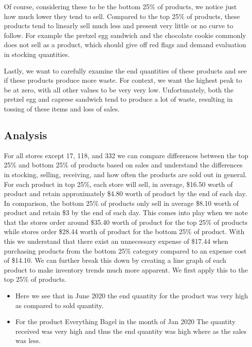 Of course, considering these to be the bottom 25\% of products, we notice just how much lower they tend to sell. Compared to the top 25\% of products, these products tend to linearly sell much less and present very little or no curve to follow. For example the pretzel egg sandwich and the chocolate cookie commonly does not sell as a product, which should give off red flags and demand evaluation in stocking quantities. 

Lastly, we want to carefully examine the end quantities of these products and see if these products produce more waste. For context, we want the highest peak to be at zero, with all other values to be very very low. Unfortunately, both the pretzel egg and caprese sandwich tend to produce a lot of waste, resulting in tossing of these items and loss of sales.

\subsection{Analysis}

For all stores except 17, 118, and 332 we can compare differences between the top 25\% and bottom 25\% of products based on sales and  understand the differences in stocking, selling, receiving, and how often the products are sold out in general. For each product in top 25\%, each  store will sell, in average, \$16.50 worth of product and retain approximately \$4.80 worth of product by the end of each day. In comparison, the  bottom 25\% of products only sell in average \$8.10 worth of product and retain \$3 by the end of each day. This comes into play when we note that  the stores order around \$35.40 worth of product for the top 25\% of products while stores order \$28.44 worth of product for the bottom 25\% of  product. With this we understand that there exist an unnecessary expense of \$17.44 when purchasing products from the bottom 25\% category  compared to an expense cost of \$14.10. 
We can further break this down by creating a line graph of each product to make inventory trends much more apparent. We first apply this to the  top 25\% of products.

\begin{itemize}
    \item Here we see that in June 2020 the end quantity for the product was very high as compared to sold quantity. 
    \item For the product Everything Bagel in the month of Jan 2020 The quantity received was very high and thus the end quantity was high where as the  sales was less.
\end{itemize}

